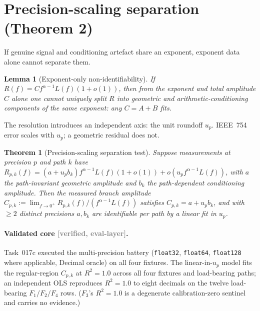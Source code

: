 \documentclass[11pt,a4paper]{article}
\newtheorem{theorem}{Theorem}
\newtheorem{lemma}{Lemma}
\newcommand{\status}[1]{\textcolor{gray}{\small\textsf{[#1]}}}
\begin{document}
\section{Precision-scaling separation (Theorem 2)}\label{sec:precision}

If genuine signal and conditioning artefact share an exponent, exponent data alone cannot separate them.

\begin{lemma}[Exponent-only non-identifiability]\label{lem:nonident}
If $R(f)=C f^{\alpha-1}L(f)(1+o(1))$, then from the exponent and total amplitude $C$ alone one cannot uniquely split $R$ into geometric and arithmetic-conditioning components of the same exponent: any $C=A+B$ fits.
\end{lemma}

The resolution introduces an independent axis: the unit roundoff $u_p$. IEEE~754 error scales with $u_p$; a geometric residual does not.

\begin{theorem}[Precision-scaling separation test]\label{thm:precision-separation}
Suppose measurements at precision $p$ and path $k$ have $R_{p,k}(f)=(a+u_p b_k)f^{\alpha-1}L(f)(1+o(1))+o(u_p f^{\alpha-1}L(f))$, with $a$ the path-invariant geometric amplitude and $b_k$ the path-dependent conditioning amplitude. Then the measured branch amplitude $C_{p,k}:=\lim_{f\to0^+}R_{p,k}(f)/(f^{\alpha-1}L(f))$ satisfies $C_{p,k}=a+u_p b_k$, and with $\ge2$ distinct precisions $a,b_k$ are identifiable per path by a linear fit in $u_p$.
\end{theorem}

\paragraph{Validated core \status{verified, eval-layer}.} Task~017c executed the multi-precision battery (\texttt{float32}, \texttt{float64}, \texttt{float128} where applicable, Decimal oracle) on all four fixtures. The linear-in-$u_p$ model fits the regular-region $C_{p,k}$ at $R^2=1.0$ across all four fixtures and load-bearing paths; an independent OLS reproduces $R^2=1.0$ to eight decimals on the twelve load-bearing $F_1/F_2/F_4$ rows. ($F_3$'s $R^2=1.0$ is a degenerate calibration-zero sentinel and carries no evidence.)
\end{document}

